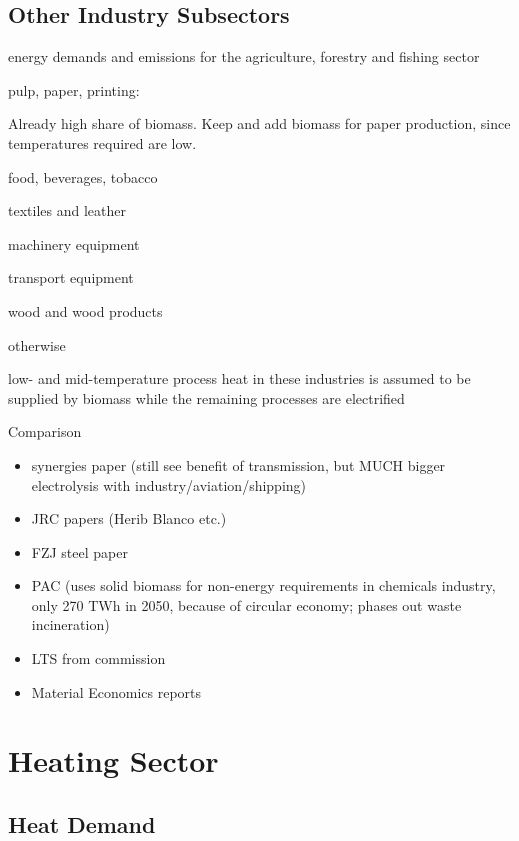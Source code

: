 \subsection{Other Industry Subsectors}
\label{sec:si:industry:other}

energy demands and \co emissions for the agriculture, forestry and fishing
sector

pulp, paper, printing:

Already high share of biomass. Keep and add biomass for paper production, since
temperatures required are low.

food, beverages, tobacco 

textiles and leather

machinery equipment


transport equipment

wood and wood products

otherwise

low- and mid-temperature process heat in these industries is assumed to be supplied by biomass
while the remaining processes are electrified

Comparison

\begin{itemize}
    \item synergies paper (still see benefit of transmission, but MUCH bigger electrolysis with industry/aviation/shipping) 
    \item JRC papers (Herib Blanco etc.) 
    \item FZJ steel paper
    \item PAC (uses solid biomass for non-energy requirements in chemicals industry, only 270 TWh in 2050, because of circular economy; phases out waste incineration) 
    \item LTS from commission 
    \item Material Economics reports 
\end{itemize}

\section{Heating Sector}
\label{sec:si:heat}

\subsection{Heat Demand}
\label{sec:si:heat:demand}

